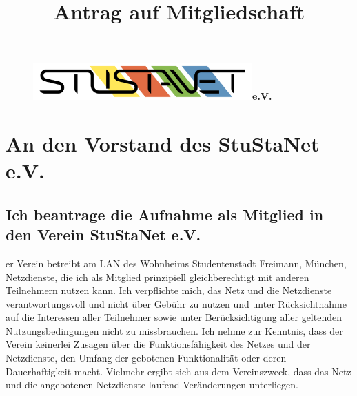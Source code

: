 \documentclass[a4paper,10pt]{scrartcl}
\title{Antrag auf Mitgliedschaft}
\date{}
\begin{document}

\maketitle
\vspace{-60pt}

\begin{figure}[t!]
   \centering
   \vspace{-40pt}
   \mbox{\includegraphics[width=0.75\textwidth,keepaspectratio]{StuStaNet_Logo}\Huge \sffamily \textbf{e.V.}}
   \vspace{-40pt}
\end{figure}


\section*{An den Vorstand des StuStaNet e.V.}

\subsection*{Ich beantrage die Aufnahme als Mitglied in den Verein StuStaNet e.V.}
er Verein betreibt am LAN des Wohnheims Studentenstadt Freimann, München, Netzdienste, die ich als Mitglied prinzipiell gleichberechtigt mit anderen Teilnehmern nutzen kann. Ich verpflichte mich, das Netz und die Netzdienste verantwortungsvoll und nicht über Gebühr zu nutzen und unter Rücksichtnahme auf die Interessen aller Teilnehmer sowie unter Berücksichtigung aller geltenden Nutzungsbedingungen nicht zu missbrauchen. Ich nehme zur Kenntnis, dass der Verein keinerlei Zusagen über die Funktionsfähigkeit des Netzes und der Netzdienste, den Umfang der gebotenen Funktionalität oder deren Dauerhaftigkeit macht. Vielmehr ergibt sich aus dem Vereinszweck, dass das Netz und die angebotenen Netzdienste laufend Veränderungen unterliegen.
\end{document}
